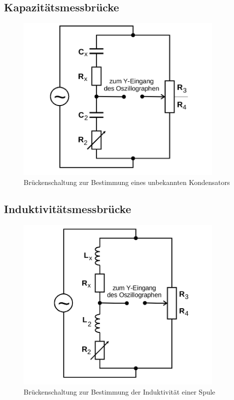 \subsection{Kapazitätsmessbrücke}
\begin{figure}
  \centering
  \includegraphics[width=0.9\textwidth]{Bilder/kapazitaetmessbruecke.png}
  \caption{Brückenschaltung zur Bestimmung eines unbekannten Kondensators \cite{Anleitung}}
  \label{fig:kapazitaetmessbrücke}
\end{figure}
\blindtext
\subsection{Induktivitätsmessbrücke}
\begin{figure}
  \centering
  \includegraphics[width=0.9\textwidth]{Bilder/Messbruecke_Spule_mit_R.png}
  \caption{Brückenschaltung zur Bestimmung der Induktivität einer Spule  \cite{Anleitung}}
  \label{fig:induktivitätsmessbrücke}
\end{figure}
\blindtext
